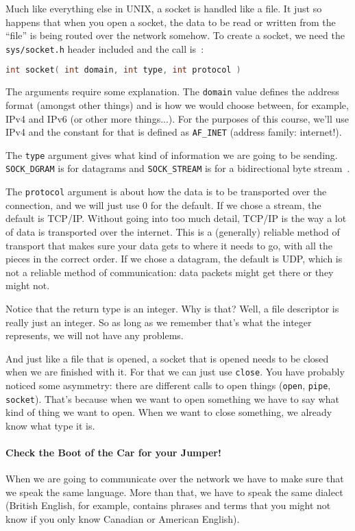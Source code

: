 Much like everything else in UNIX, a socket is handled like a file. It just so happens that when you open a socket, the data to be read or written from the ``file'' is being routed over the network somehow. To create a socket, we need the \texttt{sys/socket.h} header included and the call is~\cite{apunix}:

\begin{lstlisting}[language=C]
int socket( int domain, int type, int protocol )
\end{lstlisting}

The arguments require some explanation. The \texttt{domain} value defines the address format (amongst other things) and is how we would choose between, for example, IPv4 and IPv6 (or other more things...). For the purposes of this course, we'll use IPv4 and the constant for that is defined as \texttt{AF\_INET} (address family: internet!).

The \texttt{type} argument gives what kind of information we are going to be sending. \texttt{SOCK\_DGRAM} is for datagrams and \texttt{SOCK\_STREAM} is for a bidirectional byte stream~\cite{apunix}.

The \texttt{protocol} argument is about how the data is to be transported over the connection, and we will just use 0 for the default. If we chose a stream, the default is TCP/IP. Without going into too much detail, TCP/IP is the way a lot of data is transported over the internet. This is a (generally) reliable method of transport that makes sure your data gets to where it needs to go, with all the pieces in the correct order. If we chose a datagram, the default is UDP, which is not a reliable method of communication: data packets might get there or they might not.

Notice that the return type is an integer. Why is that? Well, a file descriptor is really just an integer. So as long as we remember that's what the integer represents, we will not have any problems.

And just like a file that is opened, a socket that is opened needs to be closed when we are finished with it. For that we can just use \texttt{close}. You have probably noticed some asymmetry: there are different calls to open things (\texttt{open}, \texttt{pipe}, \texttt{socket}). That's because when we want to open something we have to say what kind of thing we want to open. When we want to close something, we already know what type it is.

\paragraph{Check the Boot of the Car for your Jumper!}
When we are going to communicate over the network we have to make sure that we speak the same language. More than that, we have to speak the same dialect (British English, for example, contains phrases and terms that you might not know if you only know Canadian or American English).

